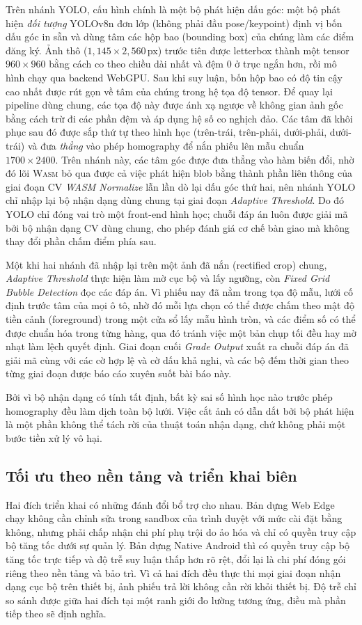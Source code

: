 \documentclass[conference]{IEEEtran}
\newcommand{\wasm}{\textnormal{\textsc{Wasm}}}
\begin{document}
Trên nhánh YOLO, cấu hình chính là một bộ phát hiện dấu góc: một bộ phát hiện
\emph{đối tượng} YOLOv8n đơn lớp (không phải đầu pose/keypoint) định vị bốn dấu
góc in sẵn và dùng tâm các hộp bao (bounding box) của chúng làm các điểm đăng ký.
Ảnh thô ($1{,}145\times2{,}560$\,px) trước tiên được letterbox thành một tensor
$960\times960$ bằng cách co theo chiều dài nhất và đệm 0 ở trục ngắn hơn, rồi mô
hình chạy qua backend WebGPU. Sau khi suy luận, bốn hộp bao có độ tin cậy cao
nhất được rút gọn về tâm của chúng trong hệ tọa độ tensor. Để quay lại pipeline
dùng chung, các tọa độ này được ánh xạ ngược về không gian ảnh gốc bằng cách trừ
đi các phần đệm và áp dụng hệ số co nghịch đảo. Các tâm đã khôi phục sau đó được
sắp thứ tự theo hình học (trên-trái, trên-phải, dưới-phải, dưới-trái) và đưa
\emph{thẳng} vào phép homography để nắn phiếu lên mẫu chuẩn $1700\times2400$. Trên
nhánh này, các tâm góc được đưa thẳng vào hàm biến đổi, nhờ đó lõi \wasm{} bỏ qua
được cả việc phát hiện blob bằng thành phần liên thông của giai đoạn CV \emph{WASM
Normalize} lẫn lần dò lại dấu góc thứ hai, nên nhánh YOLO chỉ nhập lại bộ nhận
dạng dùng chung tại giai đoạn \emph{Adaptive Threshold}. Do đó YOLO chỉ đóng vai
trò một front-end hình học; chuỗi đáp án luôn được giải mã bởi bộ nhận dạng CV
dùng chung, cho phép đánh giá cơ chế bàn giao mà không thay đổi phần chấm điểm
phía sau.

Một khi hai nhánh đã nhập lại trên một ảnh đã nắn (rectified crop) chung,
\emph{Adaptive Threshold} thực hiện làm mờ cục bộ và lấy ngưỡng, còn \emph{Fixed
Grid Bubble Detection} đọc các đáp án. Vì phiếu nay đã nằm trong tọa độ mẫu, lưới
cố định trước tâm của mọi ô tô, nhờ đó mỗi lựa chọn có thể được chấm theo mật độ
tiền cảnh (foreground) trong một cửa sổ lấy mẫu hình tròn, và các điểm số có thể
được chuẩn hóa trong từng hàng, qua đó tránh việc một bản chụp tối đều hay mờ
nhạt làm lệch quyết định. Giai đoạn cuối \emph{Grade Output} xuất ra chuỗi đáp án
đã giải mã cùng với các cờ hợp lệ và cờ dấu khả nghi, và các bộ đếm thời gian theo
từng giai đoạn được báo cáo xuyên suốt bài báo này.

Bởi vì bộ nhận dạng có tính tất định, bất kỳ sai số hình học nào trước phép
homography đều làm dịch toàn bộ lưới. Việc cắt ảnh có dẫn dắt bởi bộ phát hiện là
một phần không thể tách rời của thuật toán nhận dạng, chứ không phải một bước tiền
xử lý vô hại.

\subsection{Tối ưu theo nền tảng và triển khai biên}
Hai đích triển khai có những đánh đổi bổ trợ cho nhau. Bản dựng Web Edge chạy
không cần chỉnh sửa trong sandbox của trình duyệt với mức cài đặt bằng không,
nhưng phải chấp nhận chi phí phụ trội do ảo hóa và chỉ có quyền truy cập bộ tăng
tốc dưới sự quản lý. Bản dựng Native Android thì có quyền truy cập bộ tăng tốc
trực tiếp và độ trễ suy luận thấp hơn rõ rệt, đổi lại là chi phí đóng gói riêng
theo nền tảng và bảo trì. Vì cả hai đích đều thực thi mọi giai đoạn nhận dạng cục
bộ trên thiết bị, ảnh phiếu trả lời không cần rời khỏi thiết bị. Độ trễ chỉ so
sánh được giữa hai đích tại một ranh giới đo lường tương ứng, điều mà phần tiếp
theo sẽ định nghĩa.
\end{document}
